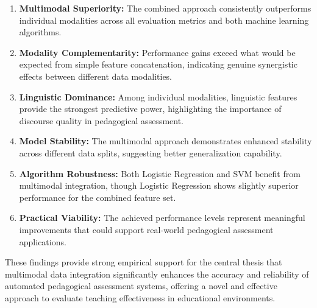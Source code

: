 \begin{enumerate}
    \item \textbf{Multimodal Superiority:} The combined approach consistently outperforms individual modalities across all evaluation metrics and both machine learning algorithms.
    
    \item \textbf{Modality Complementarity:} Performance gains exceed what would be expected from simple feature concatenation, indicating genuine synergistic effects between different data modalities.
    
    \item \textbf{Linguistic Dominance:} Among individual modalities, linguistic features provide the strongest predictive power, highlighting the importance of discourse quality in pedagogical assessment.
    
    \item \textbf{Model Stability:} The multimodal approach demonstrates enhanced stability across different data splits, suggesting better generalization capability.
    
    \item \textbf{Algorithm Robustness:} Both Logistic Regression and SVM benefit from multimodal integration, though Logistic Regression shows slightly superior performance for the combined feature set.
    
    \item \textbf{Practical Viability:} The achieved performance levels represent meaningful improvements that could support real-world pedagogical assessment applications.
\end{enumerate}

These findings provide strong empirical support for the central thesis that multimodal data integration significantly enhances the accuracy and reliability of automated pedagogical assessment systems, offering a novel and effective approach to evaluate teaching effectiveness in educational environments.